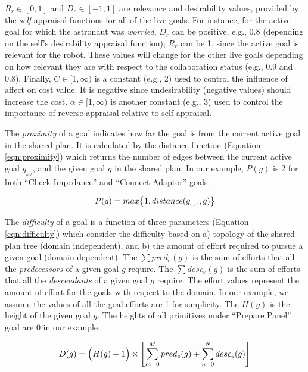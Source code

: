 \documentclass[conference]{IEEEtran}
\begin{document}
$R_r\in[0,1]$ and $D_r\in[-1,1]$ are relevance and desirability values, provided
by the \textit{self} appraisal functions for all of the live goals. For
instance, for the active goal for which the astronaut was \textit{worried},
$D_r$ can be positive, e.g., 0.8 (depending on the self's desirability appraisal
function); $R_r$ can be 1, since the active goal is relevant for the robot.
These values will change for the other live goals depending on how
relevant they are with respect to the collaboration status (e.g., 0.9 and 0.8).
Finally, $C\in[1,\infty)$ is a constant (e.g., 2) used to control the influence
of affect on cost value. It is negative since undesirability (negative values)
should increase the cost. $\alpha\in[1,\infty)$ is another constant (e.g., 3)
used to control the importance of reverse appraisal relative to self appraisal.

The \textit{proximity} of a goal indicates how far the goal is from the current
active goal in the shared plan. It is calculated by the distance function
(Equation \ref{eqn:proximity}) which returns the number of edges between the
current active goal $g_{_{act}}$, and the given goal $g$ in the shared plan. In
our example, $P(g)$ is 2 for both ``Check Impedance'' and ``Connect Adaptor''
goals.

\vspace*{-3mm}
\begin{equation}
P(g) = max\big\{1, distance(g_{_{act}},g)\big\}
\label{eqn:proximity}
\vspace*{-2mm}
\end{equation}

The \textit{difficulty} of a goal is a function of three parameters (Equation
\ref{eqn:difficulty}) which consider the difficulty based on a) topology of the
shared plan tree (domain independent), and b) the amount of effort required to
pursue a given goal (domain dependent). The $\sum pred_e(g)$ is the sum of
efforts that all the \textit{predecessors} of a given goal $g$ require. The
$\sum desc_e(g)$ is the sum of efforts that all the \textit{descendants} of a
given goal $g$ require. The effort values represent the amount of effort for the
goals with respect to the domain. In our example, we assume the values of all
the goal efforts are 1 for simplicity. The $H(g)$ is the height of the given
goal $g$. The heights of all primitives under ``Prepare Panel'' goal are 0 in
our example.

\vspace*{-5mm}
\begin{equation}
D(g) = \Big(H(g)+1\Big)\times\left[\sum\limits_{m=0}^{M} pred_e(g) +
\sum\limits_{n=0}^{N} desc_e(g)\right]
\label{eqn:difficulty}
\vspace*{-1mm}
\end{equation}
\end{document}
